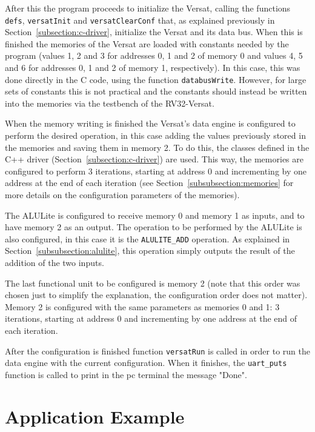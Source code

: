 After this the program proceeds to initialize the Versat, calling the functions
{\tt defs}, {\tt versatInit} and {\tt versatClearConf} that,
as explained previously in Section~\ref{subsection:c-driver}, initialize the
Versat and its data bus. When this is finished the memories of the Versat are
loaded with constants needed by the program (values 1, 2 and 3 for addresses 0,
1 and 2 of memory 0 and values 4, 5 and 6 for addresses 0, 1 and 2 of memory 1,
respectively). In this case, this was done directly in the C code, using the
function {\tt databusWrite}. However, for large sets of constants this is
not practical and the constants should instead be written into the memories via
the testbench of the RV32-Versat.

When the memory writing is finished the Versat's data engine is configured to
perform the desired operation, in this case adding the values previously stored
in the memories and saving them in memory 2. To do this, the classes defined in
the C++ driver (Section~\ref{subsection:c-driver}) are used. This way, the
memories are configured to perform 3 iterations, starting at address 0 and
incrementing by one address at the end of each iteration (see
Section~\ref{subsubsection:memories} for more details on the configuration
parameters of the memories).

The ALULite is configured to receive memory 0 and memory 1 as inputs, and to
have memory 2 as an output. The operation to be performed by the ALULite is also
configured, in this case it is the {\tt ALULITE\_ADD} operation. As explained in
Section~\ref{subsubsection:alulite}, this operation simply outputs the result of
the addition of the two inputs.

The last functional unit to be configured is memory 2 (note that this order was
chosen just to simplify the explanation, the configuration order does not
matter). Memory 2 is configured with the same parameters as memories 0 and 1: 3
iterations, starting at address 0 and incrementing by one address at the end of
each iteration.

After the configuration is finished function {\tt versatRun} is called in
order to run the data engine with the current configuration. When it finishes,
the {\tt uart\_puts} function is called to print in the pc terminal the
message "Done".


\section{Application Example}
\label{section:application}


